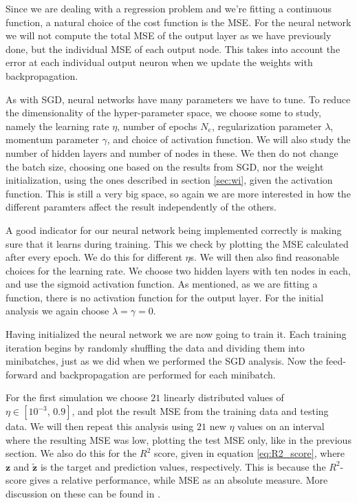 \documentclass[12pt]{extarticle}
\begin{document}
Since we are dealing with a regression problem and we're fitting a continuous function, a natural choice of the cost function is the MSE. For the neural network we will not compute the total MSE of the output layer as we have previously done, but the individual MSE of each output node. This takes into account the error at each individual output neuron when we update the weights with backpropagation.

As with SGD, neural networks have many parameters we have to tune. To reduce the dimensionality of the hyper-parameter space, we choose some to study, namely the learning rate $\eta$, number of epochs $N_e$, regularization parameter $\lambda$, momentum parameter $\gamma$, and choice of activation function. We will also study the number of hidden layers and number of nodes in these. We then do not change the batch size, choosing one based on the results from SGD, nor the weight initialization, using the ones described in section \ref{sec:wi}, given the activation function. This is still a very big space, so again we are more interested in how the different paramters affect the result independently of the others.

A good indicator for our neural network being implemented correctly is making sure that it learns during training. This we check by plotting the MSE calculated after every epoch. We do this for different $\eta$s. We will then also find reasonable choices for the learning rate. We choose two hidden layers with ten nodes in each, and use the sigmoid activation function. As mentioned, as we are fitting a function, there is no activation function for the output layer. For the initial analysis we again choose $\lambda=\gamma=0$.

Having initialized the neural network we are now going to train it. Each training iteration begins by randomly shuffling the data and dividing them into minibatches, just as we did when we performed the SGD analysis. Now the feed-forward and backpropagation are performed for each minibatch.

For the first simulation we choose $21$ linearly distributed values of $\eta\in[10^{-3},\,0.9]$, and plot the result MSE from the training data and testing data. We will then repeat this analysis using $21$ new $\eta$ values on an interval where the resulting MSE was low, plotting the test MSE only, like in the previous section. We also do this for the $R^2$ score, given in equation \eqref{eq:R2_score}, where $\boldsymbol{z}$ and $\boldsymbol{\tilde{z}}$ is the target and prediction values, respectively. This is because the $R^2$-score gives a relative performance, while MSE as an absolute measure. More discussion on these can be found in \cite{project1}.
\end{document}
